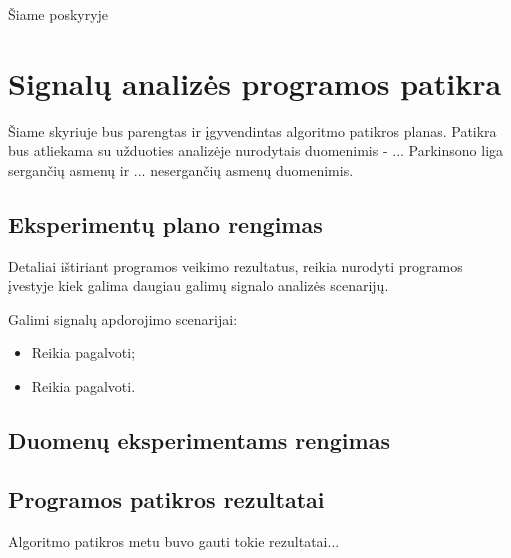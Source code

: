 \documentclass[10pt,onecolumn,draftcls]{IEEEtran}
\begin{document}
Šiame poskyryje 

\section{Signalų analizės programos patikra}

Šiame skyriuje bus parengtas ir įgyvendintas algoritmo patikros
planas. Patikra bus atliekama su užduoties analizėje nurodytais
duomenimis - ... Parkinsono liga sergančių asmenų ir ... nesergančių
asmenų duomenimis.

\subsection{Eksperimentų plano rengimas}

Detaliai ištiriant programos veikimo rezultatus, reikia nurodyti
programos įvestyje kiek galima daugiau galimų signalo analizės
scenarijų.

Galimi signalų apdorojimo scenarijai:

\begin{itemize}
\item Reikia pagalvoti;
\item Reikia pagalvoti.
\end{itemize}

\subsection{Duomenų eksperimentams rengimas}

\subsection{Programos patikros rezultatai}

Algoritmo patikros metu buvo gauti tokie rezultatai...



\end{document}
